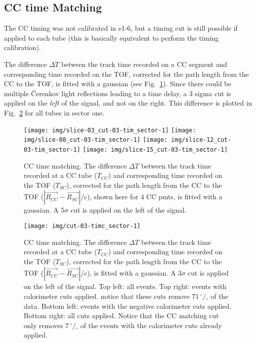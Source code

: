 \clearpage\newpage

\subsection{CC time Matching}
The CC timing was not calibrated in e1-6, but a timing cut is still possible if applied to each tube
(this is basically equivalent to perform the timing calibration).

The difference $\Delta T$ between the track time recorded on a CC segment and corresponding time recorded on the TOF,
corrected for the path length from the CC to the TOF, is fitted with a gaussian (see Fig.~\ref{fig:cc_time_slices}).
Since there could be multiple \v Cerenkov light reflections leading to a time delay,
a 3 sigma cut is applied on the {\it left} of the signal, and not on the right.
This difference is plotted in Fig.~\ref{fig:cc_time_sec1} for all tubes in sector one.

\begin{figure}[ht]
    \centering
    \texttt{[image: img/slice-03\_cut-03-tim\_sector-1]}
    \texttt{[image: img/slice-08\_cut-03-tim\_sector-1]}
    \texttt{[image: img/slice-12\_cut-03-tim\_sector-1]}
    \texttt{[image: img/slice-15\_cut-03-tim\_sector-1]}
    \caption{CC time matching. The difference $\Delta T$ between the track time recorded
    at a CC tube ($T_{CC}$) and corresponding time recorded on the TOF ($T_{SC}$),
        corrected for the path length from the CC to the TOF ($|\vec{R_{CC}}-\vec{R_{SC}}|/c$),
        shown here for 4 CC pmts, is fitted with a gaussian.
        A 5$\sigma$ cut is applied on the left of the signal.}
    \label{fig:cc_time_slices}
\end{figure}

\begin{figure}[ht]
    \centering
    \texttt{[image: img/cut-03-timc\_sector-1]}
    \caption{CC time matching. The difference $\Delta T$ between the track time recorded
    at a CC tube ($T_{CC}$) and corresponding time recorded on the TOF ($T_{SC}$),
        corrected for the path length from the CC to the TOF ($|\vec{R_{CC}}-\vec{R_{SC}}|/c$),
        is fitted with a gaussian. A 3$\sigma$ cut is applied on the left of the signal.
        Top left: all events. Top right: events with calorimeter cuts applied.
        notice that these cuts remove $71 \,^{\circ\!\!}/\!_\circ$ of the data.
        Bottom left: events with the negative calorimeter cuts applied.
        Bottom right: all cuts applied. Notice that the CC matching cut
        only removes $7  \,^{\circ\!\!}/\!_\circ$ of the events with
        the calorimeter cuts already applied.}
    \label{fig:cc_time_sec1}
\end{figure}

